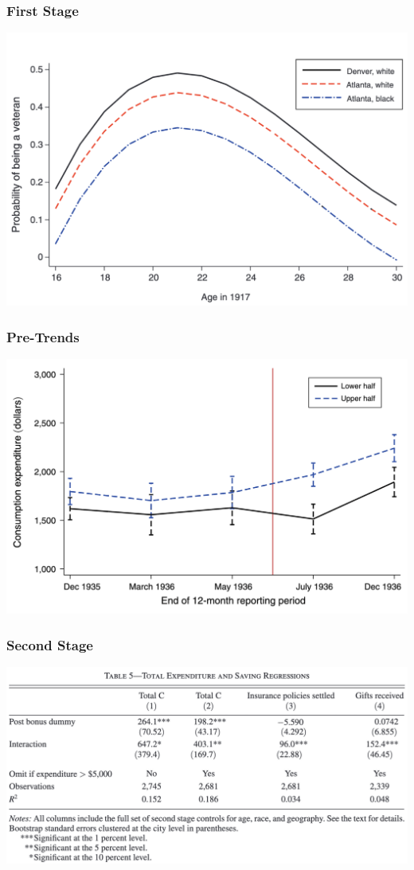 \documentclass[english,xcolor=svgnames]{beamer}
\begin{document}
\begin{frame}
	\frametitle[alignment=center]{First Stage}
	\begin{center}
		\includegraphics[scale=0.45]{figures/HFIG1.png}
	\end{center}
\end{frame}

\begin{frame}
	\frametitle[alignment=center]{Pre-Trends}
	\begin{center}
		\includegraphics[scale=0.45]{figures/HFIG2a.png}
	\end{center}
\end{frame}

\begin{frame}
	\frametitle[alignment=center]{Second Stage}
	\begin{center}
		\includegraphics[scale=0.4]{figures/HTAB5.png}
	\end{center}
\end{frame}
\end{document}
